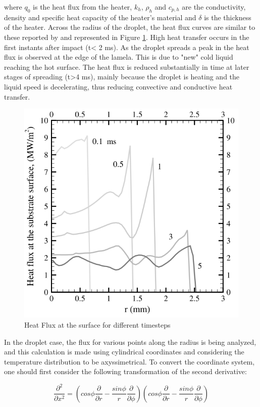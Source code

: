 where $q_0$ is the heat flux from the heater, $k_h$, $\rho_h$ and $c_{p,h}$ are the conductivity, density and specific heat capacity of the heater's material and $\delta$ is the thickness of the heater. Across the radius of the droplet, the heat flux curves are similar to these reported by \cite{pasandideh2001cooling} and represented in Figure \ref{fig:fluxo}. High heat transfer occurs in the first instants after impact (t< 2 ms). As the droplet spreads a peak in the heat flux is observed at the edge of the lamela. This is due to "new" cold liquid reaching the hot surface. The heat flux is reduced substantially in time at later stages of spreading (t>4 ms), mainly because the droplet is heating and the liquid speed is decelerating, thus reducing convective and conductive heat transfer.

\begin{figure}[h]
\centering
\includegraphics[width=0.5\linewidth]{Figures/2.Chapter/fluxo.png}
\caption {Heat Flux at the surface for different timesteps}
\label{fig:fluxo}
\end{figure}

\par In the droplet case, the flux for various points along the radius is being analyzed, and this calculation is made using cylindrical coordinates and considering the temperature distribution to be axyssimetrical. To convert the coordinate system, one should first consider the following transformation of the second derivative:

\begin{equation}
\frac{\partial^2}{\partial x^2}=(cos \phi \frac{\partial}{\partial r} - \frac{sin \phi}{r}\frac{\partial}{\partial \phi})(cos \phi \frac{\partial}{\partial r} - \frac{sin \phi}{r}\frac{\partial}{\partial \phi})
\end{equation}

